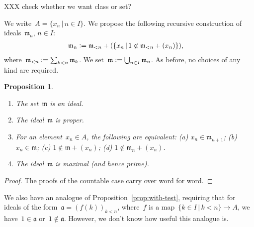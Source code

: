 \documentclass[12pt,oneside,reqno]{amsart}
\theoremstyle{definition}
\theoremstyle{plain}
\newtheorem{prop}[defn]{Proposition}
\theoremstyle{remark}
\newcommand{\aaa}{\mathfrak{a}}
\newcommand{\mmm}{\mathfrak{m}}
\newcommand{\defeq}{\vcentcolon=}
\renewcommand{\_}{\mathpunct{.}\,}
\begin{document}
XXX check whether we want class or set?

We write~$A = \{ x_n \,|\, n \in I \}$.
We propose the following recursive construction of ideals~$\mmm_n$, $n \in I$:
\begin{align*}
  \mmm_n &\defeq \mmm_{<n} + (\{ x_n \,|\, 1 \not\in \mmm_{<n} + (x_n) \}),
\end{align*}
where~$\mmm_{<n} \defeq \sum_{k < n} \mmm_k$. We set~$\mmm \defeq \bigcup_{n
\in I} \mmm_n$. As before, no choices of any kind are required.

\begin{prop}\begin{enumerate}
\item The set~$\mmm$ is an ideal.
\item The ideal~$\mmm$ is proper.
\item For an element~$x_n \in A$, the following are equivalent: (a) $x_n \in
\mmm_{n+1}$; (b) $x_n \in \mmm$; (c) $1 \not\in \mmm + (x_n)$; (d) $1 \not \in \mmm_n + (x_n)$.
\item The ideal~$\mmm$ is maximal (and hence prime).
\end{enumerate}
\end{prop}

\begin{proof}The proofs of the countable case carry over word for word.
\end{proof}

We also have an analogue of Proposition~\ref{prop:with-test}, requiring that
for ideals of the form~$\aaa = (f(k))_{k < n}$, where~$f$ is a map~$\{ k \in I
\,|\, k < n \} \to A$, we have~$1 \in \aaa$ or~$1 \not\in \aaa$. However, we
don't know how useful this analogue is.
\end{document}
